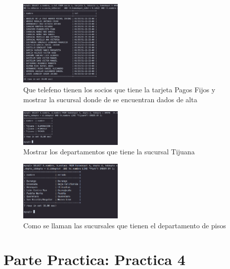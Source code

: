 \documentclass[12pt, fleqn]{article}                             %
\begin{document}
        \begin{figure}[ht!]
            \centering
            \includegraphics[width=0.45\textwidth]{BD3Reporte15}
            \caption{Que telefeno tienen los socios que tiene la tarjeta Pagos Fijos y mostrar la sucursal donde de se encuentran dados de alta}
        \end{figure}

        \begin{figure}[ht!]
            \centering
            \includegraphics[width=0.45\textwidth]{BD3Reporte16}
            \caption{Mostrar los departamentos que tiene la sucursal Tijuana}
        \end{figure}

        \begin{figure}[ht!]
            \centering
            \includegraphics[width=0.45\textwidth]{BD3Reporte17}
            \caption{Como se llaman las sucursales que tienen el departamento de pisos}
        \end{figure}






\clearpage
\section{Parte Practica: Practica 4}
\end{document}
